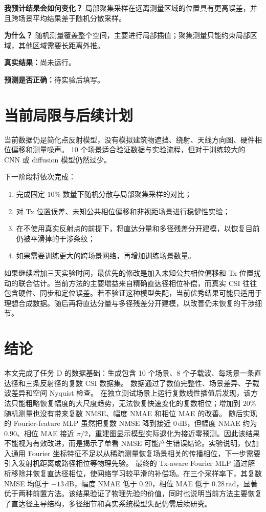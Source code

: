\documentclass[UTF8,a4paper,11pt]{ctexart}
\begin{document}
\textbf{我预计结果会如何变化？}
局部聚集采样在远离测量区域的位置具有更高误差，并且跨场景平均结果差于随机分散采样。

\textbf{为什么？}
随机测量覆盖整个空间，主要进行局部插值；聚集测量只能约束局部区域，其他区域需要长距离外推。

\textbf{真实结果：}尚未运行。

\textbf{预测是否正确：}待实验后填写。

\section{当前局限与后续计划}

当前数据仍是简化点反射模型，没有模拟建筑物遮挡、绕射、天线方向图、硬件相位偏移和测量噪声。
10 个场景适合验证数据与实验流程，但对于训练较大的 CNN 或 diffusion 模型仍然过少。

下一阶段将依次完成：
\begin{enumerate}[label=(\arabic*)]
    \item 完成固定 $10\%$ 数量下随机分散与局部聚集采样的对比；
    \item 对 Tx 位置误差、未知公共相位偏移和非视距场景进行稳健性实验；
    \item 在不使用真实反射点的前提下，将直达分量和多径残差分开建模，以恢复目前仍被平滑掉的干涉条纹；
    \item 如果需要训练更大的跨场景网络，再增加训练场景数量。
\end{enumerate}

如果继续增加三天实验时间，最优先的修改是加入未知公共相位偏移和 Tx 位置扰动的联合估计。当前方法的主要增益来自精确直达径相位补偿，而真实 CSI 往往包含硬件、同步和定位误差。若不验证这种模型失配，当前优秀结果可能只适用于理想合成数据。随后再将直达分量与多径残差分开建模，以改善仍未恢复的干涉细节。

\section{结论}

本文完成了任务 D 的数据基础：生成包含 10 个场景、8 个子载波、每场景一条直达径和三条反射径的复数 CSI 数据集。
数据通过了数值完整性、场景差异、子载波差异和空间 Nyquist 检查。
在独立测试场景上运行复数线性插值后发现，该方法只能粗略恢复幅度的大尺度趋势，无法恢复快速变化的复数相位；增加到 $20\%$ 随机测量也没有带来复数 NMSE、幅度 NMAE 和相位 MAE 的改善。
随后实现的 Fourier-feature MLP 虽然把复数 NMSE 降到接近 $0\,\mathrm{dB}$，但幅度 NMAE 约为 $0.90$、相位 MAE 接近 $\pi/2$，重建图显示模型实际退化为接近零预测。因此该结果不能视为有效改进，而是揭示了单看 NMSE 可能产生错误结论。实验说明，仅加入通用 Fourier 坐标特征不足以从稀疏测量恢复场景相关的传播相位，下一步需要引入发射机距离或路径相位等物理先验。
最终的 Tx-aware Fourier MLP 通过解析移除并恢复直达径相位，使网络学习较平滑的补偿场。在三个采样率下，其复数 NMSE 均低于 $-13\,\mathrm{dB}$，幅度 NMAE 低于 $0.20$，相位 MAE 低于 $0.28\,\mathrm{rad}$，显著优于两种前置方法。该结果验证了物理先验的价值，同时也说明当前方法主要恢复了直达径主导结构，多径细节和真实系统模型失配仍需后续研究。
\end{document}
